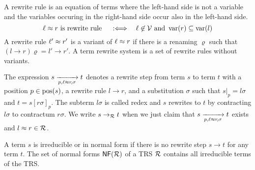 \begin{definition}
	A {\myem rewrite rule} is an equation of terms where the left-hand side is not a variable
	and the variables occuring in the right-hand side occur also in the left-hand side.
	\[
		\ell\approx r \text{ is rewrite rule }\quad :\Longleftrightarrow\quad\ell\not\in{\mathcal V}\text{ and }\operatorname{var}(r)\subseteq\operatorname{var}(l)
	\] 
	A rewrite rule $\ell'\approx r'$ is a {\myem variant} of $\ell\approx r$ if there is a renaming $\varrho$
	such that 
	$(l\rightarrow r)\varrho = l'\rightarrow r'$.
	A {\myem term rewrite system} is a set of rewrite rules without variants.
	
	The expression $s\xrightarrow[{p,\ell\approx r\!,\sigma}]{}t$ denotes a {\myem rewrite step} 
	from term $s$ to term $t$
	with 
	a position $p\in\operatorname{pos}(s)$,
	a rewrite rule $l\rightarrow r$,
	and a substitution $\sigma$ such that
	$s|_p=l\sigma$ and $t=s[r\sigma]_p$.
	The subterm $l\sigma$ is called {\myem redex} and
	$s$ rewrites to $t$ by {\myem contracting} $l\sigma$ to {\myem contractum} $r\sigma$.
	We write $s\rightarrow_{\mathcal R} t$ when we just claim that $s\xrightarrow[{p,\ell\approx r\!, \sigma}]{}t$ exists and $l\approx r\in{\mathcal R}$.
	
	
	A term $s$ is {\myem irreducible} or in {\myem normal form} if there is no rewrite step $s\rightarrow t$ for any term $t$. 
	The set of normal forms $\mathsf{NF}({\mathcal R})$ of a TRS ${\mathcal R}$ contains all irreducible terms of the TRS.
	\end{definition}
